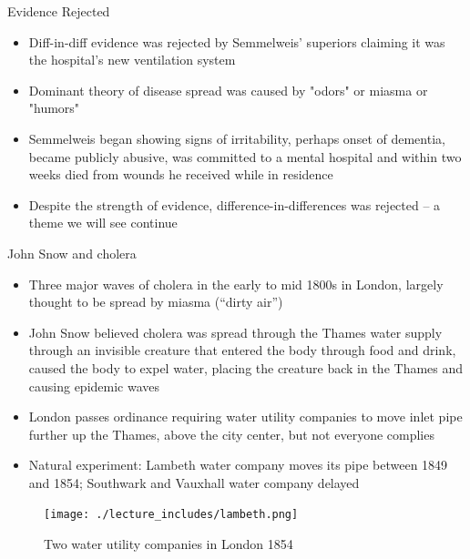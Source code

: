 \documentclass{beamer}
\begin{document}
\begin{frame}{Evidence Rejected}

\begin{itemize}

\item Diff-in-diff evidence was rejected by Semmelweis' superiors claiming it was the hospital's new ventilation system
\item Dominant theory of disease spread was caused by "odors" or miasma or "humors"
\item Semmelweis began showing signs of irritability, perhaps onset of dementia, became publicly abusive, was committed to a mental hospital and within two weeks died from wounds he received while in residence
\item Despite the strength of evidence, difference-in-differences was rejected -- a theme we will see continue

\end{itemize}

\end{frame}






\begin{frame}{John Snow and cholera}

\begin{itemize}
\item Three major waves of cholera in the early to mid 1800s in London, largely thought to be spread by miasma (``dirty air'')
\item John Snow believed cholera was spread through the Thames water supply through an invisible creature that entered the body through food and drink, caused the body to expel water, placing the creature back in the Thames and causing epidemic waves
\item London passes ordinance requiring water utility companies to move inlet pipe further up the Thames, above the city center, but not everyone complies
\item Natural experiment: Lambeth water company moves its pipe between 1849 and 1854; Southwark and Vauxhall water company delayed
\end{itemize}

\end{frame}


\begin{frame}

	\begin{figure}
	\caption{Two water utility companies in London 1854}
	\texttt{[image: ./lecture\_includes/lambeth.png]}
	\end{figure}


\end{frame}
\end{document}
